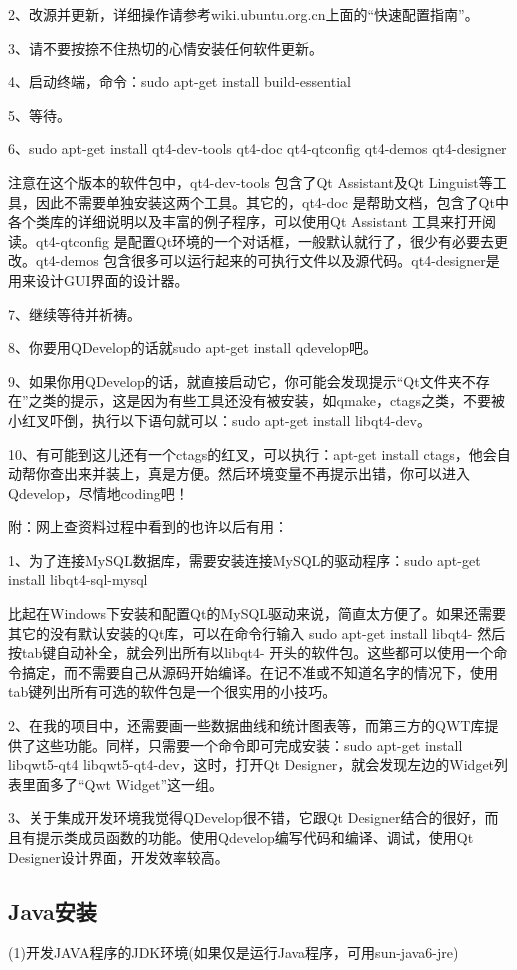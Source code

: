 2、改源并更新，详细操作请参考wiki.ubuntu.org.cn上面的“快速配置指南”。

3、请不要按捺不住热切的心情安装任何软件更新。

4、启动终端，命令：sudo apt-get install build-essential

5、等待。

6、sudo apt-get install qt4-dev-tools qt4-doc qt4-qtconfig qt4-demos qt4-designer

注意在这个版本的软件包中，qt4-dev-tools 包含了Qt Assistant及Qt Linguist等工具，因此不需要单独安装这两个工具。其它的，qt4-doc 是帮助文档，包含了Qt中各个类库的详细说明以及丰富的例子程序，可以使用Qt Assistant 工具来打开阅读。qt4-qtconfig 是配置Qt环境的一个对话框，一般默认就行了，很少有必要去更改。qt4-demos 包含很多可以运行起来的可执行文件以及源代码。qt4-designer是用来设计GUI界面的设计器。

7、继续等待并祈祷。

8、你要用QDevelop的话就sudo apt-get install qdevelop吧。

9、如果你用QDevelop的话，就直接启动它，你可能会发现提示“Qt文件夹不存在”之类的提示，这是因为有些工具还没有被安装，如qmake，ctags之类，不要被小红叉吓倒，执行以下语句就可以：sudo apt-get install libqt4-dev。

10、有可能到这儿还有一个ctags的红叉，可以执行：apt-get install ctags，他会自动帮你查出来并装上，真是方便。然后环境变量不再提示出错，你可以进入Qdevelop，尽情地coding吧！

附：网上查资料过程中看到的也许以后有用：

1、为了连接MySQL数据库，需要安装连接MySQL的驱动程序：sudo apt-get install libqt4-sql-mysql

比起在Windows下安装和配置Qt的MySQL驱动来说，简直太方便了。如果还需要其它的没有默认安装的Qt库，可以在命令行输入 sudo apt-get install libqt4- 然后按tab键自动补全，就会列出所有以libqt4- 开头的软件包。这些都可以使用一个命令搞定，而不需要自己从源码开始编译。在记不准或不知道名字的情况下，使用tab键列出所有可选的软件包是一个很实用的小技巧。

2、在我的项目中，还需要画一些数据曲线和统计图表等，而第三方的QWT库提供了这些功能。同样，只需要一个命令即可完成安装：sudo apt-get install libqwt5-qt4 libqwt5-qt4-dev，这时，打开Qt Designer，就会发现左边的Widget列表里面多了“Qwt Widget”这一组。

3、关于集成开发环境我觉得QDevelop很不错，它跟Qt Designer结合的很好，而且有提示类成员函数的功能。使用Qdevelop编写代码和编译、调试，使用Qt Designer设计界面，开发效率较高。

\subsection{Java安装}
(1)开发JAVA程序的JDK环境(如果仅是运行Java程序，可用sun-java6-jre)

